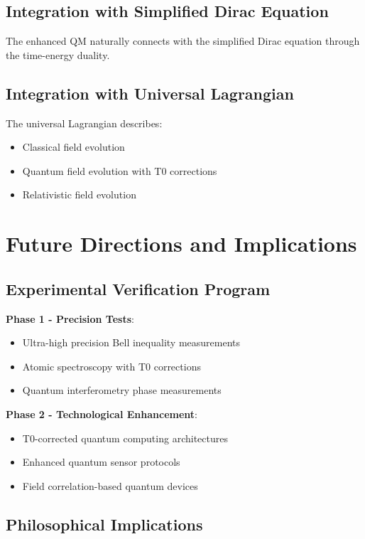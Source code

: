 \documentclass[12pt,a4paper]{article}
\begin{document}
	\subsection{Integration with Simplified Dirac Equation}
	
	The enhanced QM naturally connects with the simplified Dirac equation through the time-energy duality.
	
	\subsection{Integration with Universal Lagrangian}
	
	The universal Lagrangian describes:
	\begin{itemize}
		\item Classical field evolution
		\item Quantum field evolution with T0 corrections
		\item Relativistic field evolution
	\end{itemize}
	
	\section{Future Directions and Implications}
	
	\subsection{Experimental Verification Program}
	
	\textbf{Phase 1 - Precision Tests}:
	\begin{itemize}
		\item Ultra-high precision Bell inequality measurements
		\item Atomic spectroscopy with T0 corrections
		\item Quantum interferometry phase measurements
	\end{itemize}
	
	\textbf{Phase 2 - Technological Enhancement}:
	\begin{itemize}
		\item T0-corrected quantum computing architectures
		\item Enhanced quantum sensor protocols
		\item Field correlation-based quantum devices
	\end{itemize}
	
	\subsection{Philosophical Implications}
	
\end{document}
